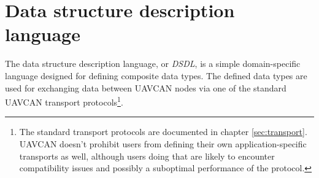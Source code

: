 \chapter{Data structure description language}\label{sec:dsdl}

The data structure description language, or \emph{DSDL}, is a simple domain-specific language designed for
defining composite data types.
The defined data types are used for exchanging data between UAVCAN nodes via one of the standard UAVCAN
transport protocols\footnote{The standard transport protocols are documented in chapter \ref{sec:transport}.
UAVCAN doesn't prohibit users from defining their own application-specific transports as well,
although users doing that are likely to encounter compatibility issues and possibly a suboptimal
performance of the protocol.}.










